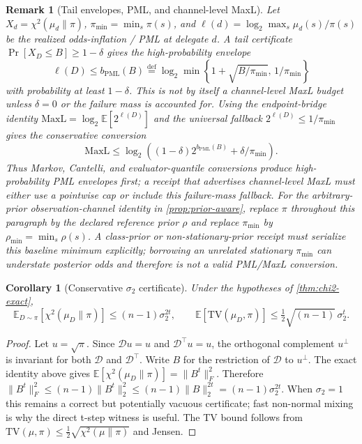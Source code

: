 \documentclass[11pt]{article}
\newtheorem{corollary}[theorem]{Corollary}
\newtheorem{remark}[theorem]{Remark}
\newcommand{\TV}{\mathrm{TV}}
\newcommand{\E}{\mathbb{E}}
\newcommand{\defeq}{\stackrel{\mathrm{def}}{=}}
\newcommand{\cD}{\mathcal{D}}
\begin{document}
\begin{remark}[Tail envelopes, PML, and channel-level MaxL]
Let $X_d=\chi^2(\mu_d\|\pi)$, $\pi_{\min}=\min_s\pi(s)$, and
$\ell(d)=\log_2\max_s\mu_d(s)/\pi(s)$ be the realized odds-inflation / PML at
delegate $d$.  A tail certificate $\Pr[X_D\le B]\ge 1-\delta$ gives the
high-probability envelope
\[
\ell(D)\le b_{\mathrm{PML}}(B)\defeq\log_2\min\left\{1+\sqrt{B/\pi_{\min}},\,1/\pi_{\min}
\right\}
\]
with probability at least $1-\delta$.  This is not by itself a channel-level
MaxL budget unless $\delta=0$ or the failure mass is accounted for.  Using the
endpoint-bridge identity $\mathrm{MaxL}=\log_2\E[2^{\ell(D)}]$ and the universal
fallback $2^{\ell(D)}\le 1/\pi_{\min}$ gives the conservative conversion
\[
\mathrm{MaxL}\le\log_2\left((1-\delta)2^{b_{\mathrm{PML}}(B)}+\delta/\pi_{\min}
\right).
\]
Thus Markov, Cantelli, and evaluator-quantile conversions produce
high-probability PML envelopes first; a receipt that advertises channel-level
MaxL must either use a pointwise cap or include this failure-mass fallback.
For the arbitrary-prior observation-channel identity in \cref{prop:prior-aware},
replace $\pi$ throughout this paragraph by the declared reference prior $\rho$
and replace $\pi_{\min}$ by $\rho_{\min}=\min_s\rho(s)$.  A class-prior or
non-stationary-prior receipt must serialize this baseline minimum explicitly;
borrowing an unrelated stationary $\pi_{\min}$ can understate posterior odds and
therefore is not a valid PML/MaxL conversion.
\end{remark}

\begin{corollary}[Conservative $\sigma_2$ certificate]\label{cor:sigma2}
Under the hypotheses of \cref{thm:chi2-exact},
\[
\E_{D\sim\pi}\!\left[\chi^2(\mu_D\|\pi)\right]\le (n-1)\sigma_2^{2t},
\qquad
\E[\TV(\mu_D,\pi)] \le \tfrac12\sqrt{(n-1)}\,\sigma_2^{t}.
\]
\end{corollary}
\begin{proof}
Let $u=\sqrt{\pi}$.  Since $\cD u=u$ and $\cD^\top u=u$, the orthogonal complement
$u^\perp$ is invariant for both $\cD$ and $\cD^\top$.  Write $B$ for the restriction
of $\cD$ to $u^\perp$.  The exact identity above gives
$\E[\chi^2(\mu_D\|\pi)]=\|B^t\|_F^2$.  Therefore
$\|B^t\|_F^2\le (n-1)\|B^t\|_2^2\le (n-1)\|B\|_2^{2t}=(n-1)\sigma_2^{2t}$.
When $\sigma_2=1$ this remains a correct but potentially vacuous certificate;
fast non-normal mixing is why the direct t-step witness is useful.  The TV bound
follows from $\TV(\mu,\pi)\le \frac12\sqrt{\chi^2(\mu\|\pi)}$ and Jensen.
\end{proof}
\end{document}

